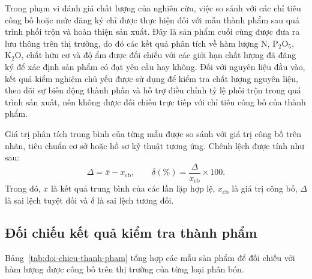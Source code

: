 

Trong phạm vi đánh giá chất lượng của nghiên cứu, việc so sánh với các chỉ tiêu công bố hoặc mức đăng ký chỉ được thực hiện đối với mẫu thành phẩm sau quá trình phối trộn và hoàn thiện sản xuất. Đây là sản phẩm cuối cùng được đưa ra lưu thông trên thị trường, do đó các kết quả phân tích về hàm lượng N, $\mathrm{P_2O_5}$, $\mathrm{K_2O}$, chất hữu cơ và độ ẩm được đối chiếu với các giới hạn chất lượng đã đăng ký để xác định sản phẩm có đạt yêu cầu hay không. Đối với nguyên liệu đầu vào, kết quả kiểm nghiệm chủ yếu được sử dụng để kiểm tra chất lượng nguyên liệu, theo dõi sự biến động thành phần và hỗ trợ điều chỉnh tỷ lệ phối trộn trong quá trình sản xuất, nên không được đối chiếu trực tiếp với chỉ tiêu công bố của thành phẩm.

Giá trị phân tích trung bình của từng mẫu được so sánh với giá trị công bố trên nhãn, tiêu chuẩn cơ sở hoặc hồ sơ kỹ thuật tương ứng. Chênh lệch được tính như sau:
\[
  \Delta = \bar{x}-x_{\mathrm{cb}}, \qquad
  \delta(\%)=\frac{\Delta}{x_{\mathrm{cb}}}\times100.
\]
Trong đó, $\bar{x}$ là kết quả trung bình của các lần lặp hợp lệ, $x_{\mathrm{cb}}$ là giá trị công bố, $\Delta$ là sai lệch tuyệt đối và $\delta$ là sai lệch tương đối.



\subsection{Đối chiếu kết quả kiểm tra thành phẩm}
Bảng~\ref{tab:doi-chieu-thanh-pham} tổng hợp các mẫu sản phẩm để đối chiếu với hàm lượng được công bố trên thị trường của từng loại phân bón.



